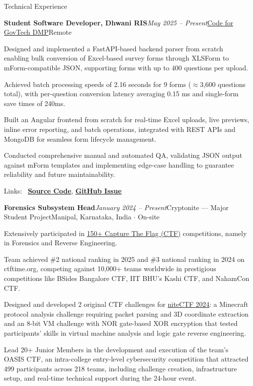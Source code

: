 \documentclass{resume} %
\begin{document}
\begin{rSection}{Technical Experience}

\begin{rSubsection}{\bf Student Software Developer, Dhwani RIS}{\em May 2025 -- Present}{\href{https://codeforgovtech.in/dedicated_mentoring_program/}{Code for GovTech DMP}}{Remote}
\item Designed and implemented a FastAPI-based backend parser from scratch enabling bulk conversion of Excel-based survey forms through XLSForm to mForm-compatible JSON, supporting forms with up to 400 questions per upload.
\item Achieved batch processing speeds of 2.16 seconds for 9 forms ($\approx$3,600 questions total), with per-question conversion latency averaging 0.15 ms and single-form save times of 240ms.
\item Built an Angular frontend from scratch for real-time Excel uploads, live previews, inline error reporting, and batch operations, integrated with REST APIs and MongoDB for seamless form lifecycle management.
\item Conducted comprehensive manual and automated QA, validating JSON output against mForm templates and implementing edge-case handling to guarantee reliability and future maintainability.
\item Links: \faGithub~\href{https://github.com/vee1e/bulk-questionnaire-upload}{\textbf{\underline{Source Code}}}, \href{https://github.com/dhwani-ris/bulk-questionnaire-upload/issues/1}{\textbf{\underline{GitHub Issue}}}
\end{rSubsection}

\begin{rSubsection}{\bf Forensics Subsystem Head}{\em January 2024 -- Present}{Cryptonite --- Major Student Project}{Manipal, Karnataka, India $\cdot$ On-site}
\item Extensively participated in \href{https://ctftime.org/team/62713/}{150+ Capture The Flag (CTF)} competitions, namely in Forensics and Reverse Engineering.
\item Team achieved \#2 national ranking in 2025 and \#3 national ranking in 2024 on ctftime.org, competing against 10,000+ teams worldwide in prestigious competitions like BSides Bangalore CTF, IIT BHU's Kashi CTF, and NahamCon CTF.
\item Designed and developed 2 original CTF challenges for \href{https://github.com/Cryptonite-MIT/niteCTF-2024/}{niteCTF 2024}: a Minecraft protocol analysis challenge requiring packet parsing and 3D coordinate extraction and an 8-bit VM challenge with NOR gate-based XOR encryption that tested participants' skills in virtual machine analysis and logic gate reverse engineering.
\item Lead 20+ Junior Members in the development and execution of the team's OASIS CTF, an intra-college entry-level cybersecurity competition that attracted 499 participants across 218 teams, including challenge creation, infrastructure setup, and real-time technical support during the 24-hour event.
\end{rSubsection}


\end{rSection}
\end{document}
